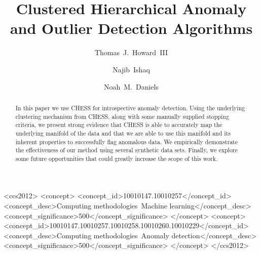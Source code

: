 \documentclass[sigconf]{acmart}
\begin{document}
\title{Clustered Hierarchical Anomaly and Outlier Detection Algorithms}

\author{Thomas~J.~Howard~III}

\author{Najib~Ishaq}
\authornotemark[1]

\author{Noah~M.~Daniels}

\renewcommand{\shortauthors}{Howard and Ishaq, et al.}

\begin{abstract}
In this paper we use CHESS for introspective anomaly detection.
Using the underlying clustering mechanism from CHESS, along with some manually supplied stopping criteria, we present strong evidence that CHESS is able to accurately map the underlying manifold of the data and that we are able to use this manifold and its inherent properties to successfully flag anomalous data.
We empirically demonstrate the effectiveness of our method using several synthetic data sets.
Finally, we explore some future opportunities that could greatly increase the scope of this work.
\end{abstract}

\begin{CCSXML}
<ccs2012>
   <concept>
       <concept_id>10010147.10010257</concept_id>
       <concept_desc>Computing methodologies~Machine learning</concept_desc>
       <concept_significance>500</concept_significance>
       </concept>
   <concept>
       <concept_id>10010147.10010257.10010258.10010260.10010229</concept_id>
       <concept_desc>Computing methodologies~Anomaly detection</concept_desc>
       <concept_significance>500</concept_significance>
       </concept>
 </ccs2012>
\end{CCSXML}



\maketitle








\end{document}
